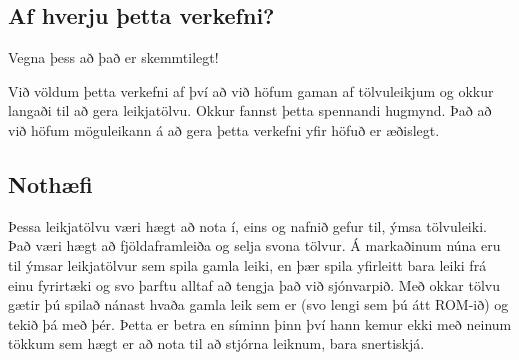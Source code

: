 \subsection{Af hverju þetta verkefni?}

Vegna þess að það er skemmtilegt!

Við völdum þetta verkefni af því að við höfum gaman af tölvuleikjum og okkur langaði til að gera leikjatölvu. Okkur fannst þetta spennandi hugmynd. Það að við höfum möguleikann á að gera þetta verkefni yfir höfuð er æðislegt.

\subsection{Nothæfi}

Þessa leikjatölvu væri hægt að nota í, eins og nafnið gefur til, ýmsa tölvuleiki. Það væri hægt að fjöldaframleiða og selja svona tölvur. Á markaðinum núna eru til ýmsar leikjatölvur sem spila gamla leiki, en þær spila yfirleitt bara leiki frá einu fyrirtæki og svo þarftu alltaf að tengja það við sjónvarpið. Með okkar tölvu gætir þú spilað nánast hvaða gamla leik sem er (svo lengi sem þú átt ROM-ið) og tekið þá með þér. Þetta er betra en síminn þinn því hann kemur ekki með neinum tökkum sem hægt er að nota til að stjórna leiknum, bara snertiskjá.